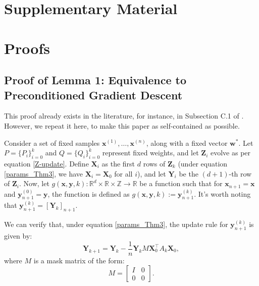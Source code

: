 \documentclass[11pt]{article}
\numberwithin{equation}{section}
\begin{document}

\setlength{\bibsep}{3pt}


\newpage
\section*{Supplementary Material}
\appendix

\section{Proofs}
\subsection{Proof of Lemma 1: Equivalence to Preconditioned Gradient Descent}
\label{Proof of Lemma 1}

This proof already exists in the literature, for instance, in Subsection C.1 of \cite{ahn2024transformers}. However, we repeat it here, to make this paper as self-contained as possible.

Consider a set of fixed samples \( \mathbf{x}^{(1)}, \dots, \mathbf{x}^{(n)} \), along with a fixed vector \( \mathbf{w}^* \). Let \( P = \{P_i\}_{i=0}^{k} \) and \( Q = \{Q_i\}_{i=0}^{k} \) represent fixed weights, and let \( \mathbf{Z}_i \) evolve as per equation \eqref{Z-update}. Define \( \mathbf{X}_i \) as the first \( d \) rows of \( \mathbf{Z}_k \) (under equation \eqref{params_Thm3}, we have \( \mathbf{X}_i = \mathbf{X}_0 \) for all \( i \)), and let \( \mathbf{Y}_i \) be the \( (d+1) \)-th row of \( \mathbf{Z}_i \). Now, let \( g(\mathbf{x}, \mathbf{y}, k) : \mathbb{R}^d \times \mathbb{R} \times \mathbb{Z} \to \mathbb{R} \) be a function such that for \( \mathbf{x}_{n+1} = \mathbf{x} \) and \( \mathbf{y}_{n+1}^{(0)} = \mathbf{y} \), the function is defined as \( g(\mathbf{x}, \mathbf{y}, k) := \mathbf{y}_{n+1}^{(k)} \). It’s worth noting that \( \mathbf{y}_{n+1}^{(k)} = [\mathbf{Y}_k]_{n+1} \).

We can verify that, under equation \eqref{params_Thm3}, the update rule for \( \mathbf{y}_{n+1}^{(k)} \) is given by:
\begin{equation}
\mathbf{Y}_{k+1} = \mathbf{Y}_k - \frac{1}{n} \mathbf{Y}_k M \mathbf{X}_0^\top A_k \mathbf{X}_0,
\label{Yk_update}
\end{equation}
where \( M \) is a mask matrix of the form:
\[
M = \begin{bmatrix} I & 0 \\ 0 & 0 \end{bmatrix}.
\]
\end{document}
